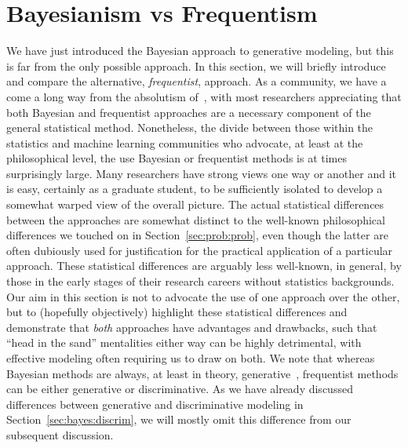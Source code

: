 
\section{Bayesianism vs Frequentism}
\label{sec:bayes:religions}

We have just introduced the Bayesian approach to generative modeling, but this is far from
the only possible approach.  In this section, we will briefly introduce and compare the alternative, \emph{frequentist}, approach.
As a community, we have a come a long way from the absolutism of~\cite{feller1950introduction}, with most researchers 
appreciating that
both Bayesian and frequentist approaches are a necessary component of the general statistical method.
Nonetheless, the divide between those within 
the statistics and machine learning communities
who advocate, at least at the philosophical level, the use Bayesian or frequentist methods 
is at times surprisingly large.  Many researchers
have strong views one way or another and it is easy, certainly as a graduate student,
to be sufficiently isolated to develop a somewhat warped view of the overall picture.
The actual statistical differences between the approaches are somewhat distinct to the 
well-known philosophical differences we touched
on in Section~\ref{sec:prob:prob}, even though the latter are often dubiously used for justification 
for the practical application of a particular approach. These statistical differences are arguably
less well-known, in general, by those in the early stages of their research careers without statistics
backgrounds.
Our aim in this section is not to advocate the use of one approach over the other, but to (hopefully objectively)
highlight these statistical differences and demonstrate that \emph{both} approaches have advantages and
drawbacks, such that ``head in the sand''
mentalities either way can be highly detrimental, with effective modeling often requiring us to draw
on both.
We note that whereas Bayesian methods are always, at least in theory, generative~\citep[Section~14.1]{gelman2014bayesian},
frequentist methods can be either generative or discriminative. 
As we have already discussed differences between generative and
discriminative modeling in Section~\ref{sec:bayes:discrim}, we will mostly omit this difference from our subsequent discussion.

